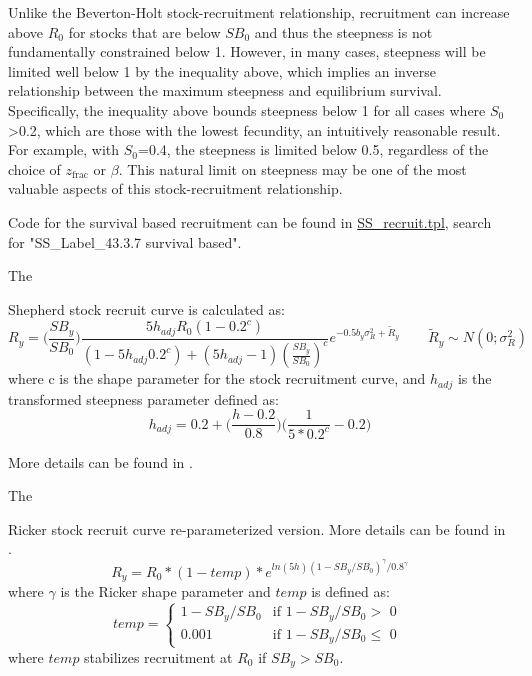 Unlike the Beverton-Holt stock-recruitment relationship, recruitment can increase above $R_0$ for stocks that are below $SB_0$ and thus the steepness is not fundamentally constrained below 1. However, in many cases, steepness will be limited well below 1 by the inequality above, which implies an inverse relationship between the maximum steepness and equilibrium survival. Specifically, the inequality above bounds steepness below 1 for all cases where $S_0$>0.2, which are those with the lowest fecundity, an intuitively reasonable result. For example, with $S_0$=0.4, the steepness is limited below 0.5, regardless of the choice of $z_{\text{frac}}$ or $\beta$. This natural limit on steepness may be one of the most valuable aspects of this stock-recruitment relationship.

Code for the survival based recruitment can be found in \href{https://github.com/nmfs-stock-synthesis/stock-synthesis/blob/main/SS_recruit.tpl}{SS\_recruit.tpl}, search for "SS\_Label\_43.3.7  survival based".

\hypertarget{Shepherd}{The} Shepherd stock recruit curve is calculated as:
\begin{equation}
R_y = \bigg(\frac{SB_y}{SB_0}\bigg)\frac{5h_{adj}R_0(1-0.2^c)}{(1-5h_{adj}0.2^c)+(5h_{adj}-1)(\frac{SB_y}{SB_0})^c}e^{-0.5b_y\sigma^2_R+\tilde{R}_y}\qquad \tilde{R}_y\sim N(0;\sigma^2_R)
\end{equation}
where c is the shape parameter for the stock recruitment curve, and $h_{adj}$ is the transformed steepness parameter defined as:
\begin{equation}
h_{adj}=0.2+\bigg(\frac{h-0.2}{0.8}\bigg)\bigg(\frac{1}{5*0.2^c}-0.2\bigg)
\end{equation}

More details can be found in \citet{punt-extending-2019}.

\hypertarget{Ricker2}{The} Ricker stock recruit curve re-parameterized version. More details can be found in \citet{punt-extending-2019}.
\begin{equation}
R_y = R_0*(1-temp)*e^{ln(5h)(1-SB_y/SB_0)^{\gamma}/0.8^{\gamma}}
\end{equation}
where $\gamma$ is the Ricker shape parameter and $temp$ is defined as:
\begin{equation}
temp = 
\begin{cases}
1-SB_y/SB_0 & \text{if $1-SB_y/SB_0 >$ 0 }\\
0.001 & \text{if $1-SB_y/SB_0 \leq$ 0}
\end{cases}		
\end{equation}
where $temp$ stabilizes recruitment at $R_0$ if $SB_y > SB_0$. 


